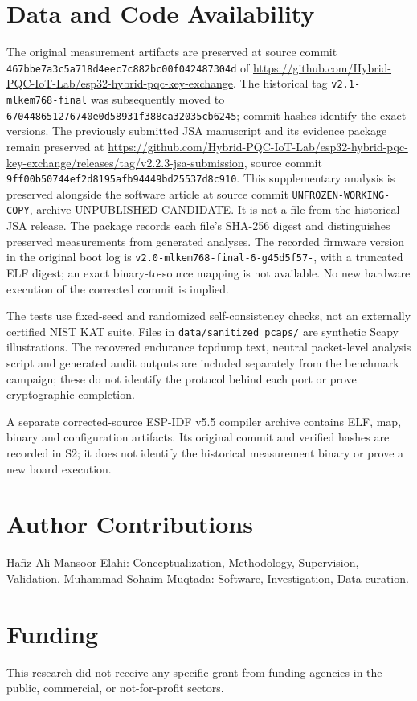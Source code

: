 \documentclass[journal, 10pt]{IEEEtran}
\newcommand{\ArtifactCommit}{UNFROZEN-WORKING-COPY}%
\newcommand{\ArtifactRelease}{UNPUBLISHED-CANDIDATE}%
\begin{document}
\section*{Data and Code Availability}
The original measurement artifacts are preserved at source commit \nolinkurl{467bbe7a3c5a718d4eec7c882bc00f042487304d} of \url{https://github.com/Hybrid-PQC-IoT-Lab/esp32-hybrid-pqc-key-exchange}. The historical tag \texttt{v2.1-mlkem768-final} was subsequently moved to \nolinkurl{670448651276740e0d58931f388ca32035cb6245}; commit hashes identify the exact versions. The previously submitted JSA manuscript and its evidence package remain preserved at \url{https://github.com/Hybrid-PQC-IoT-Lab/esp32-hybrid-pqc-key-exchange/releases/tag/v2.2.3-jsa-submission}, source commit \nolinkurl{9ff00b50744ef2d8195afb94449bd25537d8c910}. This supplementary analysis is preserved alongside the software article at source commit \nolinkurl{\ArtifactCommit}, archive \url{\ArtifactRelease}. It is not a file from the historical JSA release. The package records each file's SHA-256 digest and distinguishes preserved measurements from generated analyses. The recorded firmware version in the original boot log is \texttt{v2.0-mlkem768-final-6-g45d5f57-}, with a truncated ELF digest; an exact binary-to-source mapping is not available. No new hardware execution of the corrected commit is implied.

The tests use fixed-seed and randomized self-consistency checks, not an externally certified NIST KAT suite. Files in \texttt{data/sanitized\_pcaps/} are synthetic Scapy illustrations. The recovered endurance tcpdump text, neutral packet-level analysis script and generated audit outputs are included separately from the benchmark campaign; these do not identify the protocol behind each port or prove cryptographic completion.


A separate corrected-source ESP-IDF v5.5 compiler archive contains ELF, map, binary and configuration artifacts. Its original commit and verified hashes are recorded in S2; it does not identify the historical measurement binary or prove a new board execution.

\section*{Author Contributions}
Hafiz Ali Mansoor Elahi: Conceptualization, Methodology, Supervision, Validation.
Muhammad Sohaim Muqtada: Software, Investigation, Data curation.

\section*{Funding}
This research did not receive any specific grant from funding agencies in the public, commercial, or not-for-profit sectors.
\end{document}
